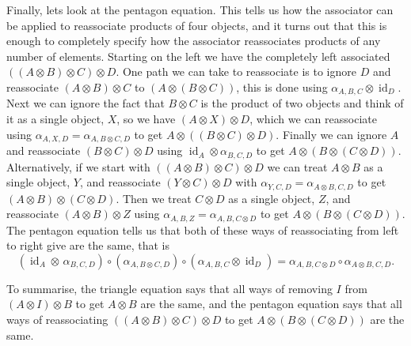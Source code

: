 \documentclass[fleqn]{NotesClass}
\DeclareMathOperator{\id}{id}
\begin{document}
    Finally, lets look at the pentagon equation.
    This tells us how the associator can be applied to reassociate products of four objects, and it turns out that this is enough to completely specify how the associator reassociates products of any number of elements.
    Starting on the left we have the completely left associated \(((A \otimes B) \otimes C) \otimes D\).
    One path we can take to reassociate is to ignore \(D\) and reassociate \((A \otimes B) \otimes C\) to \((A \otimes (B \otimes C))\), this is done using \(\alpha_{A, B, C} \otimes \id_D\).
    Next we can ignore the fact that \(B \otimes C\) is the product of two objects and think of it as a single object, \(X\), so we have \((A \otimes X) \otimes D\), which we can reassociate using \(\alpha_{A, X, D} = \alpha_{A, B \otimes C, D}\) to get \(A \otimes ((B \otimes C) \otimes D)\).
    Finally we can ignore \(A\) and reassociate \((B \otimes C) \otimes D\) using \(\id_A \otimes \alpha_{B, C, D}\) to get \(A \otimes (B \otimes (C \otimes D))\).
    Alternatively, if we start with \(((A \otimes B) \otimes C) \otimes D\) we can treat \(A \otimes B\) as a single object, \(Y\), and reassociate \((Y \otimes C) \otimes D\) with \(\alpha_{Y, C, D} = \alpha_{A \otimes B, C, D}\) to get \((A \otimes B) \otimes (C \otimes D)\).
    Then we treat \(C \otimes D\) as a single object, \(Z\), and reassociate \((A \otimes B) \otimes Z\) using \(\alpha_{A, B, Z} = \alpha_{A, B, C \otimes D}\) to get \(A \otimes (B \otimes (C \otimes D))\).
    The pentagon equation tells us that both of these ways of reassociating from left to right give are the same, that is
    \begin{equation}
        (\id_A \otimes \, \alpha_{B, C, D}) \circ (\alpha_{A, B \otimes C, D}) \circ (\alpha_{A, B, C} \otimes \id_D) = \alpha_{A, B, C\otimes D} \circ \alpha_{A\otimes B, C, D}.
    \end{equation}
    
    To summarise, the triangle equation says that all ways of removing \(I\) from \((A \otimes I) \otimes B\) to get \(A \otimes B\) are the same, and the pentagon equation says that all ways of reassociating \(((A \otimes B) \otimes C) \otimes D\) to get \(A \otimes (B \otimes (C \otimes D))\) are the same.
    
\end{document}
